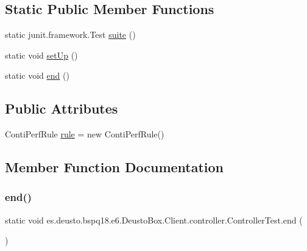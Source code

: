 \subsection*{Static Public Member Functions}
\begin{DoxyCompactItemize}
\item 
static junit.\+framework.\+Test \mbox{\hyperlink{classes_1_1deusto_1_1bspq18_1_1e6_1_1_deusto_box_1_1_client_1_1controller_1_1_controller_test_a02a2b7bdd3eda9f08d42e335289e9dd4}{suite}} ()
\item 
static void \mbox{\hyperlink{classes_1_1deusto_1_1bspq18_1_1e6_1_1_deusto_box_1_1_client_1_1controller_1_1_controller_test_afee766ebee96f0ad986e44bf54e48d27}{set\+Up}} ()
\item 
static void \mbox{\hyperlink{classes_1_1deusto_1_1bspq18_1_1e6_1_1_deusto_box_1_1_client_1_1controller_1_1_controller_test_ab6ba4d61c3ec2040ef8f49de409cc81a}{end}} ()
\end{DoxyCompactItemize}
\subsection*{Public Attributes}
\begin{DoxyCompactItemize}
\item 
Conti\+Perf\+Rule \mbox{\hyperlink{classes_1_1deusto_1_1bspq18_1_1e6_1_1_deusto_box_1_1_client_1_1controller_1_1_controller_test_a343cd51d4094a0451f62c2080d3383d8}{rule}} = new Conti\+Perf\+Rule()
\end{DoxyCompactItemize}


\subsection{Member Function Documentation}
\mbox{\label{classes_1_1deusto_1_1bspq18_1_1e6_1_1_deusto_box_1_1_client_1_1controller_1_1_controller_test_ab6ba4d61c3ec2040ef8f49de409cc81a}} 
\subsubsection{\texorpdfstring{end()}{end()}}
{\footnotesize\ttfamily static void es.\+deusto.\+bspq18.\+e6.\+Deusto\+Box.\+Client.\+controller.\+Controller\+Test.\+end (\begin{DoxyParamCaption}{ }\end{DoxyParamCaption})\hspace{0.3cm}{\ttfamily [static]}}

